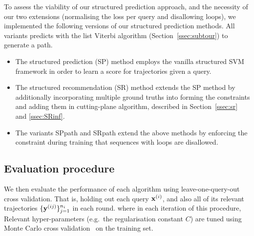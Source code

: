 To assess the viability of our structured prediction approach, and the necessity of our two extensions (normalising the loss per query and disallowing loops), we implemented the following versions of our structured prediction methods.
All variants predicts with the list Viterbi algorithm (Section~\ref{ssec:subtour}) to generate a path.
\begin{itemize}[leftmargin=0.125in]\itemmoveup
\parskip -.05em
\item The structured prediction ({\sc SP}) method employs the vanilla structured SVM framework in order to learn a score for trajectories given a query.

\item The structured recommendation ({\sc SR}) method extends the {\sc SP} method by additionally incorporating multiple ground truths into
      forming the constraints and adding them in cutting-plane algorithm,
      described in Section~\ref{ssec:sr} and \ref{ssec:SRinf}.

\item The variants {\sc SPpath} and {\sc SRpath} extend the above methods by enforcing the constraint during training 
      that sequences with loops are disallowed.
\end{itemize}\itemmoveup


\secmoveup
\subsection{Evaluation procedure}
\textmoveup

We then evaluate the performance of each algorithm using leave-one-query-out cross validation. 
That is, holding out each query $\mathbf{x}^{({i})}$, and also all of its relevant trajectories $\{\mathbf{y}^{({ij})}\}_{j=1}^{n_i}$ in each round.
where in each iteration of this procedure,
Relevant hyper-parameters (e.g.\ the regularisation constant $C$) are tuned using Monte Carlo cross validation~\cite{burman1989comparative} on the training set.

